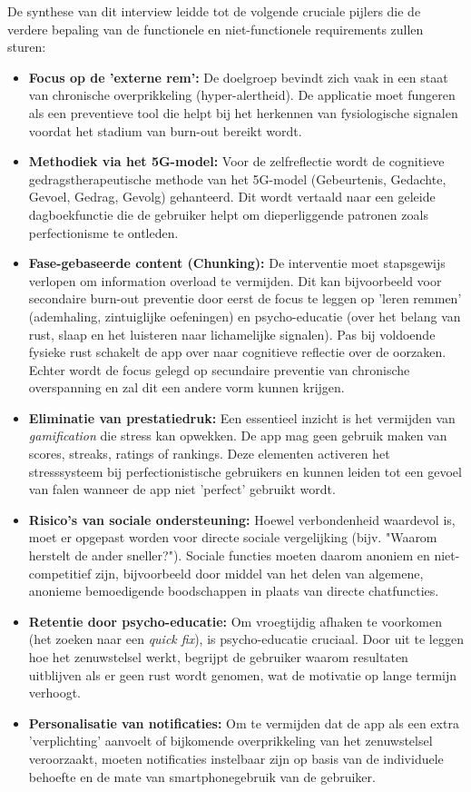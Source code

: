 \vspace{1em}

De synthese van dit interview leidde tot de volgende cruciale pijlers die de verdere bepaling van de functionele en niet-functionele requirements zullen sturen:

\begin{itemize}
    \item \textbf{Focus op de 'externe rem':} De doelgroep bevindt zich vaak in een staat van chronische overprikkeling (hyper-alertheid). De applicatie moet fungeren als een preventieve tool die helpt bij het herkennen van fysiologische signalen voordat het stadium van burn-out bereikt wordt.
    \item \textbf{Methodiek via het 5G-model:} Voor de zelfreflectie wordt de cognitieve gedragstherapeutische methode van het 5G-model (Gebeurtenis, Gedachte, Gevoel, Gedrag, Gevolg) gehanteerd. Dit wordt vertaald naar een geleide dagboekfunctie die de gebruiker helpt om dieperliggende patronen zoals perfectionisme te ontleden.
    \item \textbf{Fase-gebaseerde content (Chunking):} De interventie moet stapsgewijs verlopen om information overload te vermijden. Dit kan bijvoorbeeld voor secondaire burn-out preventie door eerst de focus te leggen op 'leren remmen' (ademhaling, zintuiglijke oefeningen) en psycho-educatie (over het belang van rust, slaap en het luisteren naar lichamelijke signalen). Pas bij voldoende fysieke rust schakelt de app over naar cognitieve reflectie over de oorzaken. Echter wordt de focus gelegd op secundaire preventie van chronische overspanning en zal dit een andere vorm kunnen krijgen.
    \item \textbf{Eliminatie van prestatiedruk:} Een essentieel inzicht is het vermijden van \textit{gamification} die stress kan opwekken. De app mag geen gebruik maken van scores, streaks, ratings of rankings. Deze elementen activeren het stresssysteem bij perfectionistische gebruikers en kunnen leiden tot een gevoel van falen wanneer de app niet 'perfect' gebruikt wordt.
    \item \textbf{Risico's van sociale ondersteuning:} Hoewel verbondenheid waardevol is, moet er opgepast worden voor directe sociale vergelijking (bijv. "Waarom herstelt de ander sneller?"). Sociale functies moeten daarom anoniem en niet-competitief zijn, bijvoorbeeld door middel van het delen van algemene, anonieme bemoedigende boodschappen in plaats van directe chatfuncties.
    \item \textbf{Retentie door psycho-educatie:} Om vroegtijdig afhaken te voorkomen (het zoeken naar een \textit{quick fix}), is psycho-educatie cruciaal. Door uit te leggen hoe het zenuwstelsel werkt, begrijpt de gebruiker waarom resultaten uitblijven als er geen rust wordt genomen, wat de motivatie op lange termijn verhoogt.
    \item \textbf{Personalisatie van notificaties:} Om te vermijden dat de app als een extra 'verplichting' aanvoelt of bijkomende overprikkeling van het zenuwstelsel veroorzaakt, moeten notificaties instelbaar zijn op basis van de individuele behoefte en de mate van smartphonegebruik van de gebruiker.
\end{itemize}

